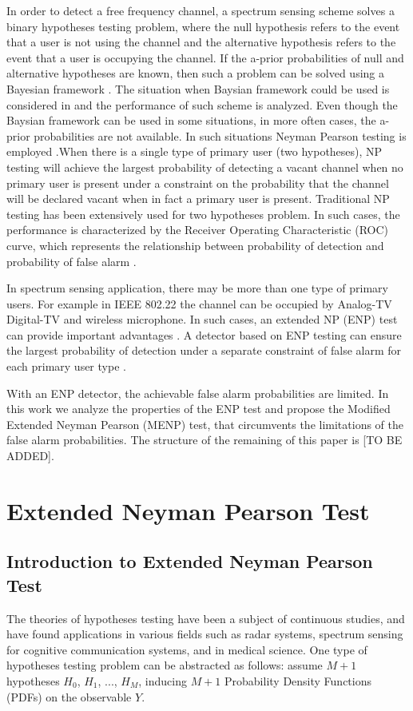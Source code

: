\documentclass[12pt,journal,a4paper,twoside,onecolumn,draft]{IEEEtran}
\begin{document}
\begin{spacing}{2.5}
In order to detect a free frequency channel, a spectrum sensing scheme solves a binary hypotheses testing problem, where the null hypothesis refers to the event that a user is not using the channel and the alternative hypothesis refers to the event that a user is occupying the channel. If the a-prior probabilities of null and alternative hypotheses are known, then such a problem can be solved using a Bayesian framework \cite{poor1994introduction}. The situation when Baysian framework could be used is considered in \cite{zeng2010review} and the performance of such scheme is analyzed.
Even though the Baysian framework can be used in some situations, in more often cases, the a-prior probabilities are not available. In such situations Neyman Pearson testing is employed \cite{poor1994introduction}.When there is a single type of primary user (two hypotheses), NP testing will achieve the largest probability of detecting a vacant channel when no primary user is present under a constraint on the probability that the channel will be declared vacant when in fact a primary user is present.
Traditional NP testing has been extensively used for two hypotheses problem. In such cases,  the performance is characterized by the Receiver Operating Characteristic (ROC) curve, which represents the relationship between probability of detection and probability of false alarm \cite{poor1994introduction}.

In spectrum sensing application, there may be more than one type of primary users. For example in IEEE 802.22 \cite{shellhammer2008spectrum} the channel can be occupied by Analog-TV Digital-TV and wireless microphone. In such cases, an extended NP (ENP) test can provide important advantages \cite{zhang1999design}. A detector based on ENP testing can ensure the largest probability of detection under a separate constraint of false alarm for each primary user type \cite{LehmannTest}.

With an ENP detector, the achievable false alarm probabilities are limited. In this work we analyze the properties of the ENP test and propose the Modified Extended Neyman Pearson (MENP) test, that circumvents the limitations of the false alarm probabilities. The structure of the remaining of this paper is [TO BE ADDED].

\section{Extended Neyman Pearson Test}

\subsection{Introduction to Extended Neyman Pearson Test}
The theories of hypotheses testing have been a subject of continuous studies, and have found applications in various fields such as radar systems, spectrum sensing for cognitive communication systems, and in  medical science. One type of hypotheses testing problem can be abstracted as  follows: assume $M+1$  hypotheses $H_0$, $H_1$, ..., $H_{M}$, inducing $M+1$  Probability Density Functions (PDFs) on the observable $Y$.


\end{spacing}
\end{document}
